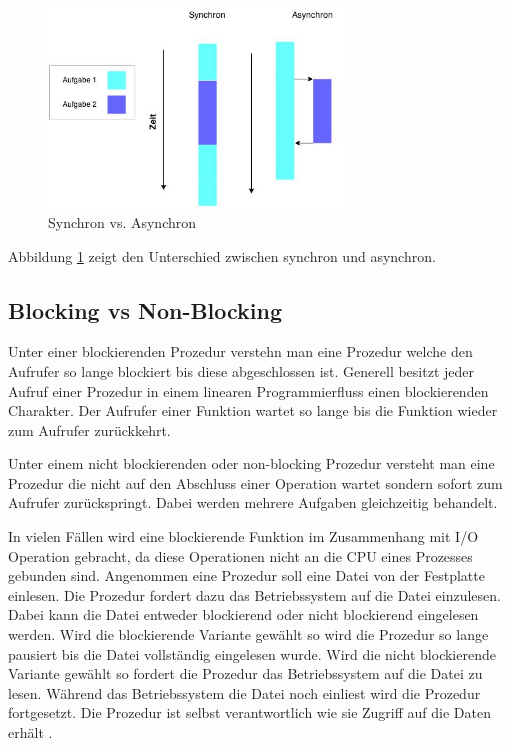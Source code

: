 \begin{figure}[!htb]
  \centering
  \includegraphics[width=8cm]{images/synchron_vs_asynchron.jpg}
  \caption{
    Synchron vs. Asynchron
  }
  \label{figure:syncron_vs_async}
\end{figure}

Abbildung \ref{figure:syncron_vs_async} zeigt den Unterschied zwischen synchron und asynchron. 

\subsection{Blocking vs Non-Blocking}

Unter einer blockierenden Prozedur verstehn man eine Prozedur welche den Aufrufer so lange blockiert bis diese abgeschlossen ist. Generell besitzt jeder Aufruf einer Prozedur in einem linearen Programmierfluss einen blockierenden Charakter. Der Aufrufer einer Funktion wartet so lange bis die Funktion wieder zum Aufrufer zurückkehrt. 

Unter einem nicht blockierenden oder non-blocking Prozedur versteht man eine Prozedur die nicht auf den Abschluss einer Operation wartet sondern sofort zum Aufrufer zurückspringt. Dabei werden mehrere Aufgaben gleichzeitig behandelt.  

In vielen Fällen wird eine blockierende Funktion im Zusammenhang mit I/O Operation gebracht, da diese Operationen nicht an die CPU eines Prozesses gebunden sind. Angenommen eine Prozedur soll eine Datei von der Festplatte einlesen. Die Prozedur fordert dazu das Betriebssystem auf die Datei einzulesen. Dabei kann die Datei entweder blockierend oder nicht blockierend eingelesen werden. Wird die blockierende Variante gewählt so wird die Prozedur so lange pausiert bis die Datei vollständig eingelesen wurde. Wird die nicht blockierende Variante gewählt so fordert die Prozedur das Betriebssystem auf die Datei zu lesen. Während das Betriebssystem die Datei noch einliest wird die Prozedur fortgesetzt. Die Prozedur ist selbst verantwortlich wie sie Zugriff auf die Daten erhält \cite[p. 47]{Erb2012}.

